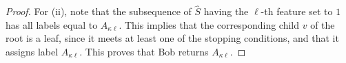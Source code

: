 \begin{proof}
For (ii), note that the subsequence of $\widehat{S}$ having the $\ell$-th feature set to $1$ has all labels equal to $A_{\kappa\ell}$. This implies that the corresponding child $v$ of the root is a leaf, since it meets at least one of the stopping conditions, and that it assigns label $A_{\kappa\ell}$. This proves that Bob returns $A_{\kappa\ell}$.

%
%
%


\end{proof}
